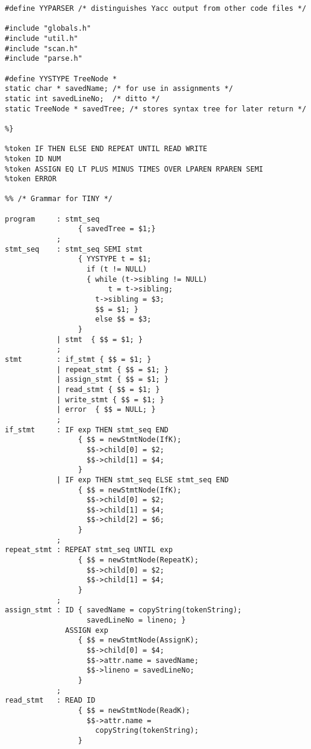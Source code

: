 \documentclass[lang=cn,10pt]{elegantbook}
\begin{document}
\begin{lstlisting}[caption={tiny.y}]
%{
#define YYPARSER /* distinguishes Yacc output from other code files */

#include "globals.h"
#include "util.h"
#include "scan.h"
#include "parse.h"

#define YYSTYPE TreeNode *
static char * savedName; /* for use in assignments */
static int savedLineNo;  /* ditto */
static TreeNode * savedTree; /* stores syntax tree for later return */

%}

%token IF THEN ELSE END REPEAT UNTIL READ WRITE
%token ID NUM 
%token ASSIGN EQ LT PLUS MINUS TIMES OVER LPAREN RPAREN SEMI
%token ERROR 

%% /* Grammar for TINY */

program     : stmt_seq
                 { savedTree = $1;} 
            ;
stmt_seq    : stmt_seq SEMI stmt
                 { YYSTYPE t = $1;
                   if (t != NULL)
                   { while (t->sibling != NULL)
                        t = t->sibling;
                     t->sibling = $3;
                     $$ = $1; }
                     else $$ = $3;
                 }
            | stmt  { $$ = $1; }
            ;
stmt        : if_stmt { $$ = $1; }
            | repeat_stmt { $$ = $1; }
            | assign_stmt { $$ = $1; }
            | read_stmt { $$ = $1; }
            | write_stmt { $$ = $1; }
            | error  { $$ = NULL; }
            ;
if_stmt     : IF exp THEN stmt_seq END
                 { $$ = newStmtNode(IfK);
                   $$->child[0] = $2;
                   $$->child[1] = $4;
                 }
            | IF exp THEN stmt_seq ELSE stmt_seq END
                 { $$ = newStmtNode(IfK);
                   $$->child[0] = $2;
                   $$->child[1] = $4;
                   $$->child[2] = $6;
                 }
            ;
repeat_stmt : REPEAT stmt_seq UNTIL exp
                 { $$ = newStmtNode(RepeatK);
                   $$->child[0] = $2;
                   $$->child[1] = $4;
                 }
            ;
assign_stmt : ID { savedName = copyString(tokenString);
                   savedLineNo = lineno; }
              ASSIGN exp
                 { $$ = newStmtNode(AssignK);
                   $$->child[0] = $4;
                   $$->attr.name = savedName;
                   $$->lineno = savedLineNo;
                 }
            ;
read_stmt   : READ ID
                 { $$ = newStmtNode(ReadK);
                   $$->attr.name =
                     copyString(tokenString);
                 }

\end{lstlisting}
\end{document}
